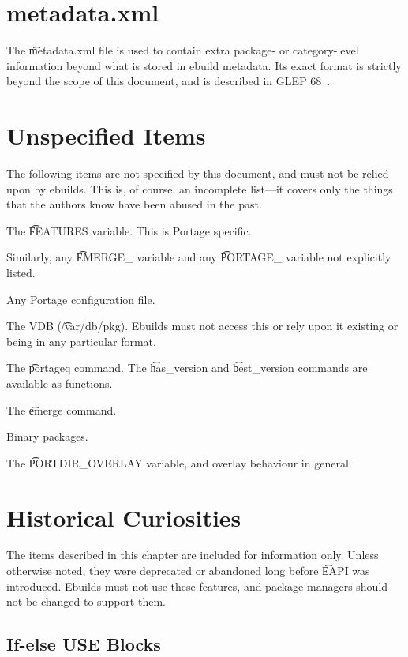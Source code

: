 \chapter{metadata.xml}
\label{sec:metadata-xml}

The \t{metadata.xml} file is used to contain extra package- or category-level information beyond
what is stored in ebuild metadata. Its exact format is strictly beyond the scope of this document,
and is described in GLEP 68~\cite{Glep68}.

\chapter{Unspecified Items}

The following items are not specified by this document, and must not be relied upon by ebuilds.
This is, of course, an incomplete list---it covers only the things that the authors know have
been abused in the past.

\begin{compactitem}
\item The \t{FEATURES} variable. This is Portage specific.
\item Similarly, any \t{EMERGE\_} variable and any \t{PORTAGE\_} variable not explicitly listed.
\item Any Portage configuration file.
\item The VDB (\t{/var/db/pkg}). Ebuilds must not access this or rely upon it existing or being
    in any particular format.
\item The \t{portageq} command. The \t{has\_version} and \t{best\_version} commands are
    available as functions.
\item The \t{emerge} command.
\item Binary packages.
\item The \t{PORTDIR\_OVERLAY} variable, and overlay behaviour in general.
\end{compactitem}

\chapter{Historical Curiosities}

The items described in this chapter are included for information only. Unless otherwise noted,
they were deprecated or abandoned long before \t{EAPI} was introduced. Ebuilds must not use these
features, and package managers should not be changed to support them.

\section{If-else USE Blocks}

